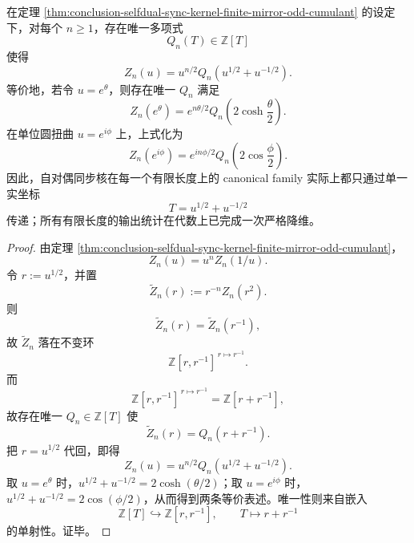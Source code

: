\begin{proposition}[有限长度配分函数的唯一降阶坐标]\label{prop:conclusion-sync-kernel-finite-length-single-coordinate}
在定理 \ref{thm:conclusion-selfdual-sync-kernel-finite-mirror-odd-cumulant} 的设定下，对每个 \(n\ge 1\)，存在唯一多项式
\[
Q_n(T)\in\mathbb Z[T]
\]
使得
\[
Z_n(u)=u^{n/2}Q_n\!\left(u^{1/2}+u^{-1/2}\right).
\]
等价地，若令 \(u=e^\theta\)，则存在唯一 \(Q_n\) 满足
\[
Z_n(e^\theta)=e^{n\theta/2}Q_n\!\left(2\cosh\frac{\theta}{2}\right).
\]
在单位圆扭曲 \(u=e^{i\phi}\) 上，上式化为
\[
Z_n(e^{i\phi})=e^{in\phi/2}Q_n\!\left(2\cos\frac{\phi}{2}\right).
\]
因此，自对偶同步核在每一个有限长度上的 canonical family 实际上都只通过单一实坐标
\[
T=u^{1/2}+u^{-1/2}
\]
传递；所有有限长度的输出统计在代数上已完成一次严格降维。
\end{proposition}
\begin{proof}
由定理 \ref{thm:conclusion-selfdual-sync-kernel-finite-mirror-odd-cumulant}，
\[
Z_n(u)=u^n Z_n(1/u).
\]
令 \(r:=u^{1/2}\)，并置
\[
\widetilde Z_n(r):=r^{-n}Z_n(r^2).
\]
则
\[
\widetilde Z_n(r)=\widetilde Z_n(r^{-1}),
\]
故 \(\widetilde Z_n\) 落在不变环
\[
\mathbb Z[r,r^{-1}]^{\,r\mapsto r^{-1}}.
\]
而
\[
\mathbb Z[r,r^{-1}]^{\,r\mapsto r^{-1}}=\mathbb Z[r+r^{-1}],
\]
故存在唯一 \(Q_n\in\mathbb Z[T]\) 使
\[
\widetilde Z_n(r)=Q_n(r+r^{-1}).
\]
把 \(r=u^{1/2}\) 代回，即得
\[
Z_n(u)=u^{n/2}Q_n\!\left(u^{1/2}+u^{-1/2}\right).
\]
取 \(u=e^\theta\) 时，\(u^{1/2}+u^{-1/2}=2\cosh(\theta/2)\)；取 \(u=e^{i\phi}\) 时，\(u^{1/2}+u^{-1/2}=2\cos(\phi/2)\)，从而得到两条等价表述。唯一性则来自嵌入
\[
\mathbb Z[T]\hookrightarrow \mathbb Z[r,r^{-1}],
\qquad
T\mapsto r+r^{-1}
\]
的单射性。证毕。
\end{proof}

\endinput
